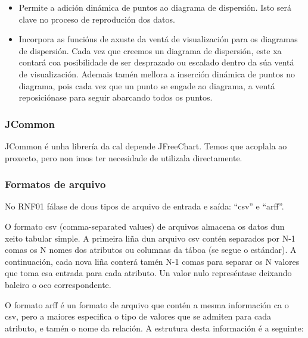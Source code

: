 \begin{itemize}
\item Permite a adición dinámica de puntos ao diagrama de dispersión. Isto será clave no proceso de reprodución dos datos.
\item Incorpora as funcións de axuste da ventá de visualización para os diagramas de dispersión. Cada vez que creemos un diagrama de dispersión, este xa contará coa posibilidade de ser desprazado ou escalado dentro da súa ventá de visualización. Ademais tamén mellora a inserción dinámica de puntos no diagrama, pois cada vez que un punto se engade ao diagrama, a ventá reposiciónase para seguir abarcando todos os puntos.
\end{itemize} 

\subsubsection{JCommon}

JCommon é unha librería da cal depende JFreeChart. Temos que acoplala ao proxecto, pero non imos ter necesidade de utilizala directamente.

\subsubsection{Formatos de arquivo}

No RNF01 fálase de dous tipos de arquivo de entrada e saída: ``csv'' e ``arff''.

O formato csv (comma-separated values) de arquivos almacena os datos dun xeito tabular simple. A primeira liña dun arquivo csv contén separados por N-1 comas os N nomes dos atributos ou columnas da táboa (se segue o estándar). A continuación, cada nova liña conterá tamén N-1 comas para separar os N valores que toma esa entrada para cada atributo. Un valor nulo represéntase deixando baleiro o oco correspondente.

O formato arff  é un formato de arquivo que contén a mesma información ca o csv, pero a maiores especifica o tipo de valores que se admiten para cada atributo, e tamén o nome da relación. A estrutura desta información é a seguinte:


